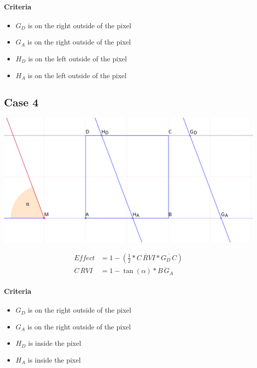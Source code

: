 \documentclass[a4paper,10pt,fleqn]{scrartcl}
\numberwithin{equation}{subsection}
\begin{document}
\paragraph{Criteria}
\begin{itemize}
 \item $G_D$ is on the right outside of the pixel
 \item $G_A$ is on the right outside of the pixel
 \item $H_D$ is on the left outside of the pixel
 \item $H_A$ is on the left outside of the pixel
\end{itemize}
%
\subsection{Case 4}
\begin{minipage}{\textwidth}
\includegraphics[width=\textwidth]{case4}
\end{minipage}
\begin{align}
Effect &= 1 - (\frac{1}{2} * \overline{C\,RVI} * \overline{G_D\,C})\\
\overline{C\,RVI} &=  1 - \tan(\alpha) * \overline{B\,G_A}
\end{align}
%
\paragraph{Criteria}
\begin{itemize}
 \item $G_D$ is on the right outside of the pixel
 \item $G_A$ is on the right outside of the pixel
 \item $H_D$ is inside the pixel
 \item $H_A$ is inside the pixel
\end{itemize}
%
\end{document}
